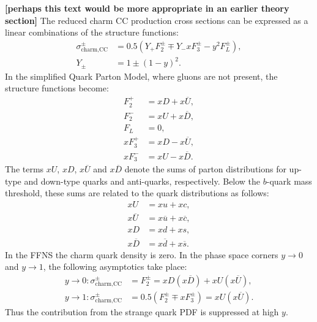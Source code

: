 \documentclass[pdftex,twocolumn,epjc3]{svjour3}          %
\begin{document}
{\bf [perhaps this text would be more appropriate in an earlier theory section]}
The reduced charm CC production cross sections can be expressed as a linear combinations of the structure functions:
\begin{equation}
\begin{split}
    \sigma^{\pm}_{\text{charm,CC}} &= 0.5(Y_{+}F_2^{\pm} \mp Y_{-}xF_3^{\pm} - y^2F_L^{\pm}),\\
    Y_{\pm} &= 1 \pm (1-y)^2.
\end{split}
\end{equation}
In the simplified Quark Parton Model, where gluons are not present, the structure functions become:
\begin{equation}
\begin{split}
    F_2^{+} &= xD + x\overline{U}, \\
    F_2^{-} &= xU + x\overline{D},\\
    F_L &= 0,\\
    xF_3^{+} &= xD - x\overline{U}, \\
    xF_3^{-} &= xU - x\overline{D}.
\end{split}
\end{equation}
The terms $xU$, $xD$, $x\overline{U}$ and $x\overline{D}$ denote the sums of parton distributions for up-type and down-type quarks and anti-quarks, respectively. 
Below the $b$-quark mass threshold, these sums are related to the quark distributions as follows:
\begin{equation}
\begin{split}
 xU &= xu + xc , \\
 x\overline{U} &= x\overline{u} + x\overline{c} , \\
 xD &= xd + xs , \\
 x\overline{D} &= x\overline{d} + x\overline{s}.
\end{split}
\end{equation}
In the FFNS the charm quark density is zero.
In the phase space corners $y \to 0$ and $y \to 1$, the following asymptotics take place:
\begin{equation}
\begin{split}
 y \to 0: \sigma^{\pm}_{\text{charm,CC}} &= F_2^{\pm} = xD(x\overline{D}) + xU(x\overline{U}), \\
 y \to 1: \sigma^{\pm}_{\text{charm,CC}} &= 0.5(F_2^{\pm} \mp xF_3^{\pm}) = xU (x\overline{U}).
\label{eq:y01}
\end{split}
\end{equation}
Thus the contribution from the strange quark PDF is suppressed at high $y$.
\end{document}
